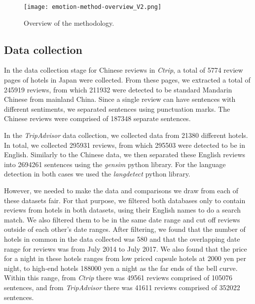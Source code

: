 \documentclass[smallextended,natbib]{svjour3}       %
\begin{document}
\begin{figure}[bp]
\centering
\texttt{[image: emotion-method-overview\_V2.png]}
\caption{Overview of the methodology.}
\label{fig:method-overview}
\end{figure}

\subsection{Data collection}\label{datacollection}

In the data collection stage for Chinese reviews in \textit{Ctrip}, a total of \num[group-separator={,}]{5774} review pages of hotels in Japan were collected. From these pages, we extracted a total of \num[group-separator={,}]{245919} reviews, from which \num[group-separator={,}]{211932} were detected to be standard Mandarin Chinese from mainland China. Since a single review can have sentences with different sentiments, we separated sentences using punctuation marks. The Chinese reviews were comprised of \num[group-separator={,}]{187348} separate sentences. 

In the \textit{TripAdvisor} data collection, we collected data from \num[group-separator={,}]{21380} different hotels. In total, we collected \num[group-separator={,}]{295931} reviews, from which \num[group-separator={,}]{295503} were detected to be in English. Similarly to the Chinese data, we then separated these English reviews into \num[group-separator={,}]{2694261} sentences using the \textit{gensim} python library. For the language detection in both cases we used the \textit{langdetect} python library.

However, we needed to make the data and comparisons we draw from each of these datasets fair. For that purpose, we filtered both databases only to contain reviews from hotels in both datasets, using their English names to do a search match. We also filtered them to be in the same date range and cut off reviews outside of each other's date ranges. After filtering, we found that the number of hotels in common in the data collected was \num[group-separator={,}]{580} and that the overlapping date range for reviews was from July 2014 to July 2017. We also found that the price for a night in these hotels ranges from low priced capsule hotels at 2000 yen per night, to high-end hotels \num[group-separator={,}]{188000} yen a night as the far ends of the bell curve. Within this range, from \textit{Ctrip} there was \num[group-separator={,}]{49561} reviews comprised of \num[group-separator={,}]{105076} sentences, and from \textit{TripAdvisor} there was \num[group-separator={,}]{41611} reviews comprised of \num[group-separator={,}]{352022} sentences.
\end{document}
